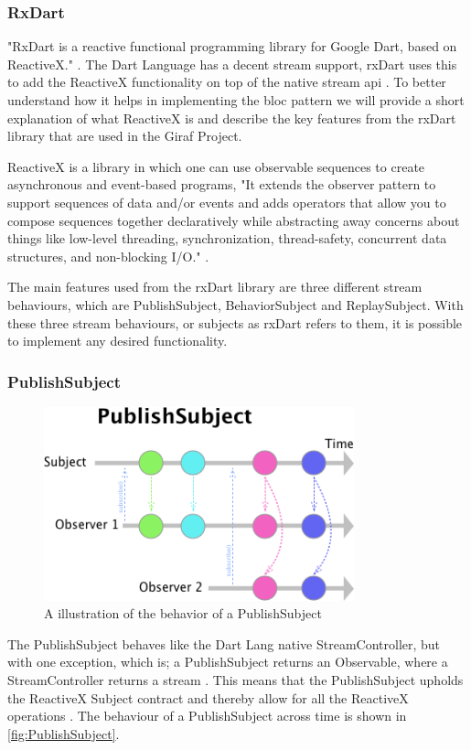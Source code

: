 \subsubsection{RxDart}
"RxDart is a reactive functional programming library for Google Dart, based on ReactiveX." \cite{rxDart}. The Dart Language has a decent stream support, rxDart uses this to add the ReactiveX functionality on top of the native stream api \cite{rxDart}. To better understand how it helps in implementing the \gls{bloc} pattern we will provide a short explanation of what ReactiveX is and describe the key features from the rxDart library that are used in the Giraf Project.

ReactiveX is a library in which one can use observable sequences to create asynchronous and event-based programs, "It extends the observer pattern to support sequences of data and/or events and adds operators that allow you to compose sequences together declaratively while abstracting away concerns about things like low-level threading, synchronization, thread-safety, concurrent data structures, and non-blocking I/O." \cite{ReactiveXWebsite}.

The main features used from the rxDart library are three different stream behaviours, which are PublishSubject, BehaviorSubject and ReplaySubject. With these three stream behaviours, or subjects as rxDart refers to them, it is possible to implement any desired functionality.

\subsubsection*{PublishSubject}
\begin{figure}[h]
    \centering
    \includegraphics[width=0.8\textwidth]{figures/PublishSubject.png}
    \caption{A illustration of the behavior of a PublishSubject}
    \label{fig:PublishSubject}
\end{figure}
The PublishSubject behaves like the Dart Lang native StreamController, but with one exception, which is; a PublishSubject returns an Observable, where a StreamController returns a stream \cite{PublishSubject}. This means that the PublishSubject upholds the ReactiveX Subject contract and thereby allow for all the ReactiveX operations \cite{PublishSubject}. The behaviour of a PublishSubject across time is shown in \autoref{fig:PublishSubject}.

